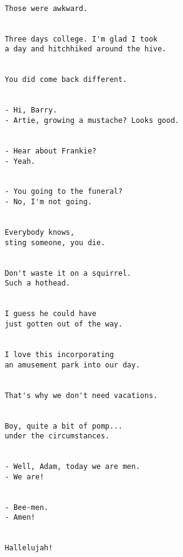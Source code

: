 \documentclass[11pt, nopagenumbers]{adamblan-hw}
\begin{document}
\begin{verbatim}
      
    Those were awkward.
    
      
    Three days college. I'm glad I took
    a day and hitchhiked around the hive.
    
      
    You did come back different.
    
      
    - Hi, Barry.
    - Artie, growing a mustache? Looks good.
    
      
    - Hear about Frankie?
    - Yeah.
    
      
    - You going to the funeral?
    - No, I'm not going.
    
      
    Everybody knows,
    sting someone, you die.
    
      
    Don't waste it on a squirrel.
    Such a hothead.
    
      
    I guess he could have
    just gotten out of the way.
    
      
    I love this incorporating
    an amusement park into our day.
    
      
    That's why we don't need vacations.
    
      
    Boy, quite a bit of pomp...
    under the circumstances.
    
      
    - Well, Adam, today we are men.
    - We are!
    
      
    - Bee-men.
    - Amen!
    
      
    Hallelujah!
    
    
\end{verbatim}

\clearpage
\end{document}
